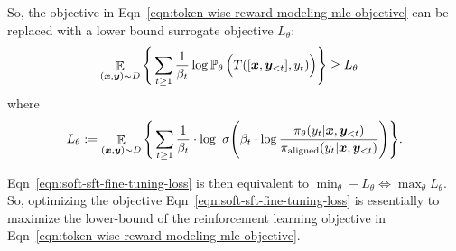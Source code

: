 So, the objective in Eqn~\ref{eqn:token-wise-reward-modeling-mle-objective} can be replaced with a lower bound surrogate objective $L_{\theta}$:
\begin{align}
    & \mathop{\mathbb E}_{(\bm{x}, \bm{y}) \sim D} \Bigg\{ \sum_{t \ge 1} \frac{1}{\beta_t}  \log \mathop{\mathbb P_{\theta}}\Big(T([\bm{x}, \bm{y}_{<t}], y_t)\Big) \Bigg\} \ge L_{\theta} 
    \label{eqn:final-consistency-result}
\end{align}
where 
\begin{equation*}
    L_{\theta} := \mathop{\mathbb E}_{(\bm{x}, \bm{y}) \sim D} \Bigg\{ \sum_{t \ge 1} \frac{1}{\beta_t} \cdot \log \ \sigma \Bigg( \beta_t \cdot \log \frac{\pi_{\theta}(y_t|\bm{x}, \bm{y}_{< t})}{\pi_{\mathrm{aligned}}(y_t|\bm{x}, \bm{y}_{<t})} \Bigg) \Bigg\}.
\end{equation*}

Eqn~\ref{eqn:soft-sft-fine-tuning-loss} is then equivalent to $\min_{\theta} -L_\theta \iff  \max_{\theta}  L_{\theta}$. So, optimizing the objective Eqn~\ref{eqn:soft-sft-fine-tuning-loss} is essentially to maximize the lower-bound of the reinforcement learning objective in Eqn~\ref{eqn:token-wise-reward-modeling-mle-objective}.

